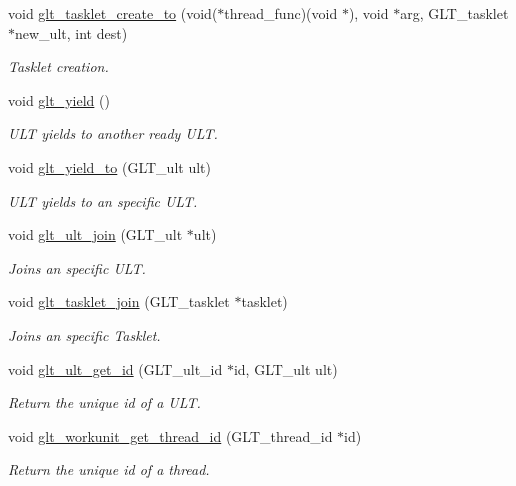 \begin{DoxyCompactItemize}
void \hyperlink{group__WORKUNIT_ga9f8fd228ad209b2086c4c6674d8186b2}{glt\-\_\-tasklet\-\_\-create\-\_\-to} (void($\ast$thread\-\_\-func)(void $\ast$), void $\ast$arg, G\-L\-T\-\_\-tasklet $\ast$new\-\_\-ult, int dest)
\begin{DoxyCompactList}\small\item\em Tasklet creation. \end{DoxyCompactList}\item 
void \hyperlink{group__WORKUNIT_gac1358e0fbff9e9d05087ec4cbe7b40fc}{glt\-\_\-yield} ()
\begin{DoxyCompactList}\small\item\em U\-L\-T yields to another ready U\-L\-T. \end{DoxyCompactList}\item 
void \hyperlink{group__WORKUNIT_gaa66f172d44a8672ae737905e8f19bda2}{glt\-\_\-yield\-\_\-to} (G\-L\-T\-\_\-ult ult)
\begin{DoxyCompactList}\small\item\em U\-L\-T yields to an specific U\-L\-T. \end{DoxyCompactList}\item 
void \hyperlink{group__WORKUNIT_ga4ea711dfc5c1244bdc256bbcb31f8193}{glt\-\_\-ult\-\_\-join} (G\-L\-T\-\_\-ult $\ast$ult)
\begin{DoxyCompactList}\small\item\em Joins an specific U\-L\-T. \end{DoxyCompactList}\item 
void \hyperlink{group__WORKUNIT_gaeaca9573cad24b9fd6bf5b827a22e3e3}{glt\-\_\-tasklet\-\_\-join} (G\-L\-T\-\_\-tasklet $\ast$tasklet)
\begin{DoxyCompactList}\small\item\em Joins an specific Tasklet. \end{DoxyCompactList}\item 
void \hyperlink{group__WORKUNIT_ga288c26892d7ff66b10cefbcbd2460e89}{glt\-\_\-ult\-\_\-get\-\_\-id} (G\-L\-T\-\_\-ult\-\_\-id $\ast$id, G\-L\-T\-\_\-ult ult)
\begin{DoxyCompactList}\small\item\em Return the unique id of a U\-L\-T. \end{DoxyCompactList}\item 
void \hyperlink{group__WORKUNIT_gaed08a54f94a57450eeec8a3cf5c0b167}{glt\-\_\-workunit\-\_\-get\-\_\-thread\-\_\-id} (G\-L\-T\-\_\-thread\-\_\-id $\ast$id)
\begin{DoxyCompactList}\small\item\em Return the unique id of a thread. \end{DoxyCompactList}\item 

\end{DoxyCompactItemize}
